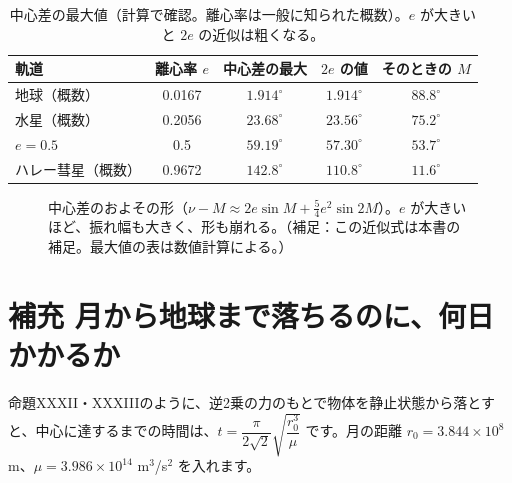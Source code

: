 \documentclass[a4paper,11pt,openany]{ltjsbook}
\begin{document}
\begin{table}[htbp]
\centering
\begin{tabular}{lcccc}
\toprule
軌道 & 離心率 $e$ & 中心差の最大 & $2e$ の値 & そのときの $M$\\
\midrule
地球（概数） & 0.0167 & $1.914^\circ$ & $1.914^\circ$ & $88.8^\circ$\\
水星（概数） & 0.2056 & $23.68^\circ$ & $23.56^\circ$ & $75.2^\circ$\\
$e=0.5$ & 0.5 & $59.19^\circ$ & $57.30^\circ$ & $53.7^\circ$\\
ハレー彗星（概数） & 0.9672 & $142.8^\circ$ & $110.8^\circ$ & $11.6^\circ$\\
\bottomrule
\end{tabular}
\caption{中心差の最大値（計算で確認。離心率は一般に知られた概数）。$e$ が大きいと $2e$ の近似は粗くなる。}
\end{table}

\begin{figure}[htbp]
\centering
{}
\caption{中心差のおよその形（$\nu-M\approx2e\sin M+\tfrac54e^2\sin2M$）。$e$ が大きいほど、振れ幅も大きく、形も崩れる。（補足：この近似式は本書の補足。最大値の表は数値計算による。）}
\end{figure}

\section{補充 月から地球まで落ちるのに、何日かかるか}

命題XXXII・XXXIIIのように、逆2乗の力のもとで物体を静止状態から落とすと、中心に達するまでの時間は、$t=\dfrac{\pi}{2\sqrt2}\sqrt{\dfrac{r_0^3}{\mu}}$ です。月の距離 $r_0=3.844\times10^8$ m、$\mu=3.986\times10^{14}$ m$^3$/s$^2$ を入れます。
\end{document}
